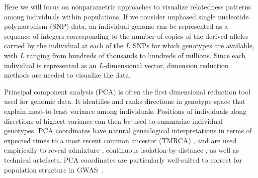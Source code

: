 \documentclass[12pt]{pnas-new}
\begin{document}
Here we will focus on nonparametric approaches to visualize relatedness patterns among individuals within populations. If we consider unphased single nucleotide polymorphism (SNP) data, an individual genome can be represented as a sequence of integers corresponding to the number of copies of the derived alleles carried by the individual at each of the $L$ SNPs for which genotypes are available, with $L$ ranging from hundreds of thousands to hundreds of millions. Since each individual is represented as an $L$-dimensional vector, dimension reduction methods are needed to visualize the data.

Principal component analysis (PCA) is often the first dimensional reduction tool used for genomic data. It identifies and ranks directions in genotype space that explain most-to-least variance among individuals. Positions of individuals along directions of highest variance can then be used to summarize individual genotypes. PCA coordinates have natural genealogical interpretations in terms of expected times to a most recent common ancestor (TMRCA) \cite{mcvean2009genealogical}, and are used empirically to reveal admixture \cite{brisbin2012pcadmix}, continuous isolation-by-distance \cite{novembre2008europe, nelson2008population}, as well as technical artefacts. PCA coordinates are particularly well-suited to correct for population structure in GWAS~\cite{eigen2006}.
\end{document}
